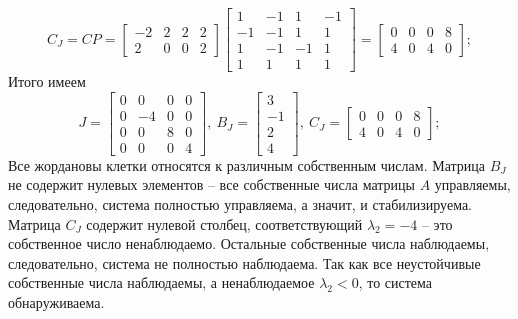 \documentclass[a4paper, 12pt]{article}
\begin{document}
    $$
    C_J=CP=\begin{bmatrix}
        -2 &2 &2 &2\\
        2 &0 &0 &2
    \end{bmatrix}\begin{bmatrix}
        1    &-1     &1    &-1\\
        -1    &-1     &1     &1\\
         1    &-1    &-1     &1\\
         1     &1     &1     &1
        \end{bmatrix}=\begin{bmatrix}
    0     &0     &0     &8\\
     4     &0     &4     &0
        \end{bmatrix};
    $$
    Итого имеем
    $$
    J=\begin{bmatrix}
        0     &0     &0     &0\\
        0    &-4     &0     &0\\
        0     &0     &8     &0\\
        0     &0     &0     &4
        \end{bmatrix},\ B_J=\begin{bmatrix}
            3\\
            -1\\
             2\\
             4
        \end{bmatrix},\ C_J=\begin{bmatrix}
            0     &0     &0     &8\\
             4     &0     &4     &0
                \end{bmatrix};
    $$
    Все жордановы клетки относятся к различным собственным числам.
    Матрица $B_J$ не содержит нулевых элементов -- все собственные числа
    матрицы $A$ управляемы, следовательно, система полностью управляема, а значит, и стабилизируема.
    Матрица $C_J$ содержит нулевой столбец, соответствующий $\lambda_2=-4$
    -- это собственное число ненаблюдаемо. Остальные собственные числа наблюдаемы,
    следовательно, система не полностью наблюдаема. Так как все неустойчивые
    собственные числа наблюдаемы, а ненаблюдаемое $\lambda_2<0$, то система обнаруживаема.
\end{document}
